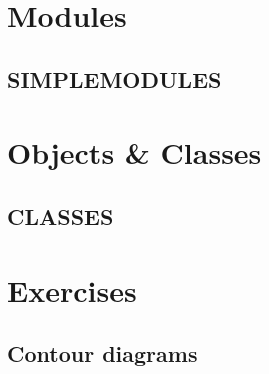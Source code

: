 \documentclass[11pt,a4paper]{book}
\begin{document}
\chapter{Modules}

\section{SIMPLEMODULES}


\chapter{Objects \& Classes}

\section{CLASSES}


\chapter{Exercises}

\section{Contour diagrams}


\backmatter
\appendix

\nocite{*}
\printbibliography
\end{document}
